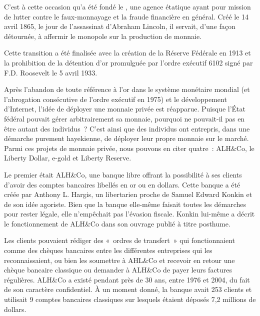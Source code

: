 C'est à cette occasion qu'a été fondé le , une agence étatique ayant pour mission de lutter contre le faux-monnayage et la fraude financière en général. Créé le 14 avril 1865, le jour de l'assassinat d'Abraham Lincoln, il servait, d'une façon détournée, à affermir le monopole sur la production de monnaie.

Cette transition a été finalisée avec la création de la Réserve Fédérale en 1913 et la prohibition de la détention d'or promulguée par l'ordre exécutif 6102 signé par F.D. Roosevelt le 5 avril 1933.

Après l'abandon de toute référence à l'or dans le système monétaire mondial (et l'abrogation consécutive de l'ordre exécutif en 1975) et le développement d'Internet, l'idée de déployer une monnaie privée est réapparue. Puisque l'État fédéral pouvait gérer arbitrairement sa monnaie, pourquoi ne pouvait-il pas en être autant des individus~? C'est ainsi que des individus ont entrepris, dans une démarche purement hayekienne, de déployer leur propre monnaie sur le marché. Parmi ces projets de monnaie privée, nous pouvons en citer quatre~: ALH\&Co, le Liberty Dollar, e-gold et Liberty Reserve.


Le premier était ALH\&Co, une banque libre offrant la possibilité à ses clients d'avoir des comptes bancaires libellés en or ou en dollars. Cette banque a été créée par Anthony L. Hargis, un libertarien proche de Samuel Edward Konkin et de son idée agoriste. Bien que la banque elle-même faisait toutes les démarches pour rester légale, elle n'empêchait pas l'évasion fiscale. Konkin lui-même a décrit le fonctionnement de ALH\&Co dans son ouvrage  publié à titre posthume.

Les clients pouvaient rédiger des «~ordres de transfert~» qui fonctionnaient comme des chèques bancaires entre les différentes entreprises qui les reconnaissaient, ou bien les soumettre à AHL\&Co et recevoir en retour une chèque bancaire classique ou demander à ALH\&Co de payer leurs factures régulières. ALH\&Co a existé pendant près de 30 ans, entre 1976 et 2004, du fait de son caractère confidentiel. À un moment donné, la banque avait 253 clients et utilisait 9 comptes bancaires classiques sur lesquels étaient déposés 7,2 millions de dollars.

